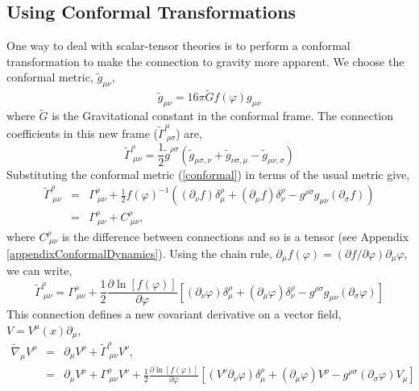 \subsection{Using Conformal Transformations}
One way to deal with scalar-tensor theories is to perform a conformal transformation to make the connection to gravity more apparent. We choose the conformal metric, $\tilde{g}_{\mu\nu}$, 
\begin{equation}\label{conformal}
    \tilde{g}_{\mu\nu} = 16\pi\tilde{G}f(\varphi)g_{\mu\nu}
\end{equation}
where $\tilde{G}$ is the Gravitational constant in the conformal frame. The connection coefficients in this new frame ($\tilde{\Gamma}^{\mu}_{\ \rho\sigma}$) are, 
\begin{equation}
    \tilde{\Gamma}^{\rho}_{\ \mu\nu} = \frac{1}{2}\tilde{g}^{\rho\sigma}\left(\tilde{g}_{\mu\sigma, \nu} + \tilde{g}_{\nu\sigma, \mu} - \tilde{g}_{\mu\nu, \sigma}  \right)
\end{equation}
Substituting the conformal metric (\ref{conformal}) in terms of the usual metric give, 
\begin{eqnarray}
    \tilde{\Gamma}^{\rho}_{\ \mu\nu} &=& \Gamma^{\rho}_{\ \mu\nu} + \frac{1}{2}f(\varphi)^{-1}\left((\partial_{\nu}f)\delta^{\rho}_{\mu} + (\partial_{\mu}f)\delta^{\rho}_{\nu} -g^{\rho\sigma}g_{\mu\nu}(\partial_{\sigma}f)\right)\\
    &=& \Gamma^{\rho}_{\ \mu\nu} + C^{\rho}_{\ \mu \nu},
\end{eqnarray}
where $C^{\rho}_{\ \mu \nu}$ is the difference between connections and so is a tensor (see Appendix \ref{appendixConformalDynamics}). Using the chain rule, $\partial_{\mu}f(\varphi) = (\partial f/\partial \varphi)\partial_{\mu}\varphi$, we can write, 
\begin{equation}
    \tilde{\Gamma}^{\rho}_{\ \mu\nu} = \Gamma^{\rho}_{\ \mu\nu} + \frac{1}{2}\frac{\partial \ln[f(\varphi)]}{\partial \varphi}\left[(\partial_{\nu}\varphi)\delta^{\rho}_{\mu} + (\partial_{\mu}\varphi)\delta^{\rho}_{\nu} -g^{\rho\sigma}g_{\mu\nu}(\partial_{\sigma}\varphi)\right]
\end{equation}
This connection defines a new covariant derivative on a vector field, $V = V^{\mu}(x)\partial_{\mu}$, 
\begin{eqnarray*}
\tilde{\nabla}_{\mu}V^{\rho} &=& \partial_{\mu}V^{\rho} + \tilde{\Gamma}^{\rho}_{\ \mu\nu}V^{\nu},\\
&=& \partial_{\mu}V^{\rho} + \Gamma^{\rho}_{\ \mu\nu}V^{\nu} + \frac{1}{2}\frac{\partial \ln[f(\varphi)]}{\partial \varphi}\left[(V^{\nu}\partial_{\nu}\varphi)\delta^{\rho}_{\mu} + (\partial_{\mu}\varphi)V^{\rho} -g^{\rho\sigma}(\partial_{\sigma}\varphi)V_{\mu}\right]
\end{eqnarray*}
